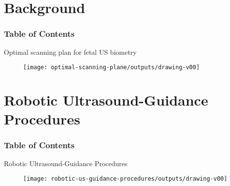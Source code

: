 \section{Background}

\begin{frame}
      \frametitle{Table of Contents}
      \tableofcontents[currentsection]
  \end{frame}


{
{

\begin{frame}{Optimal scanning plan for fetal US biometry}
      \begin{figure}
        \centering
        \texttt{[image: optimal-scanning-plane/outputs/drawing-v00]}
      \end{figure}
\end{frame}
}




\section{Robotic Ultrasound-Guidance Procedures}
\begin{frame}
      \frametitle{Table of Contents}
      \tableofcontents[currentsection]
  \end{frame}


{

\begin{frame}{Robotic Ultrasound-Guidance Procedures}
      \begin{figure}
        \centering
        \texttt{[image: robotic-us-guidance-procedures/outputs/drawing-v00]}
      \end{figure}
\end{frame}
}


}
